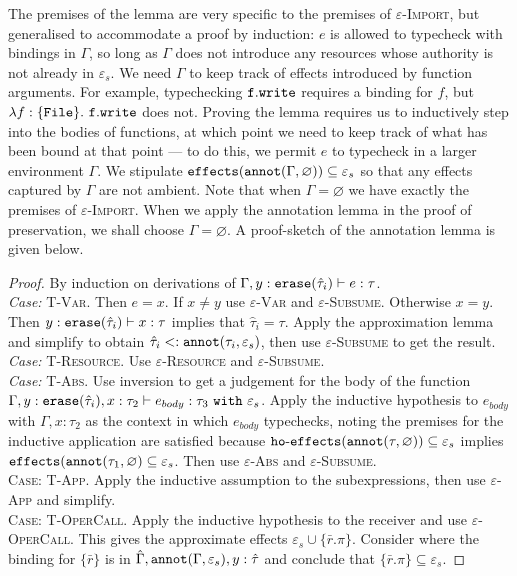 The premises of the lemma are very specific to the premises of \textsc{$\varepsilon$-Import}, but generalised to accommodate a proof by induction: $e$ is allowed to typecheck with bindings in $\Gamma$, so long as $\Gamma$ does not introduce any resources whose authority is not already in $\varepsilon_s$. We need $\Gamma$ to keep track of effects introduced by function arguments. For example, typechecking $\mathtt{f.write}$ requires a binding for $f$, but $\lambda f: \{\mathtt{File}\}.~\mathtt{f.write}$ does not. Proving the lemma requires us to inductively step into the bodies of functions, at which point we need to keep track of what has been bound at that point --- to do this, we permit $e$ to typecheck in a larger environment $\Gamma$. We stipulate $\mathtt{effects}(\mathtt{annot}(\Gamma, \varnothing)) \subseteq \varepsilon_s$ so that any effects captured by $\Gamma$ are not ambient. Note that when $\Gamma = \varnothing$ we have exactly the premises of \textsc{$\varepsilon$-Import}. When we apply the annotation lemma in the proof of preservation, we shall choose $\Gamma = \varnothing$. A proof-sketch of the annotation lemma is given below.

\begin{proof}
By induction on derivations of $\Gamma, y: \mathtt{erase}(\hat \tau_i) \vdash e: \tau$.\\

\textit{Case:} \textsc{T-Var}. Then $e = x$. If $x \neq y$ use \textsc{$\varepsilon$-Var} and \textsc{$\varepsilon$-Subsume}. Otherwise $x = y$. Then $y: \mathtt{erase}(\hat \tau_i) \vdash x: \tau$ implies that $\hat \tau_i = \tau$. Apply the approximation lemma and simplify to obtain $\hat \tau_i <: \mathtt{annot}(\tau_i, \varepsilon_s)$, then use \textsc{$\varepsilon$-Subsume} to get the result.\\

\textit{Case:} \textsc{T-Resource}. Use \textsc{$\varepsilon$-Resource} and \textsc{$\varepsilon$-Subsume}.\\

\textit{Case:} \textsc{T-Abs}. Use inversion to get a judgement for the body of the function $\Gamma, y: \mathtt{erase}(\hat \tau_i), x: \tau_2 \vdash e_{body}: \tau_3~\mathtt{with}~ \varepsilon_s$. Apply the inductive hypothesis to $e_{body}$ with $\Gamma, x: \tau_2$ as the context in which $e_{body}$ typechecks, noting the premises for the inductive application are satisfied because $\mathtt{ho \hbox{-} effects}(\mathtt{annot}(\tau, \varnothing)) \subseteq \varepsilon_s$ implies $\mathtt{effects}(\mathtt{annot}(\tau_1, \varnothing) \subseteq \varepsilon_s$. Then use \textsc{$\varepsilon$-Abs} and \textsc{$\varepsilon$-Subsume}.	\\

\textsc{Case:} \textsc{T-App}. Apply the inductive assumption to the subexpressions, then use \textsc{$\varepsilon$-App} and simplify.\\

\textsc{Case:} \textsc{T-OperCall}. Apply the inductive hypothesis to the receiver and use \textsc{$\varepsilon$-OperCall}. This gives the approximate effects $\varepsilon_s \cup \{ \bar r.\pi \}$. Consider where the binding for $\{ \bar r \}$ is in $\hat \Gamma, \mathtt{annot}(\Gamma, \varepsilon_s), y: \hat \tau$ and conclude that $\{ \bar r.\pi \} \subseteq \varepsilon_s$.
\end{proof}

